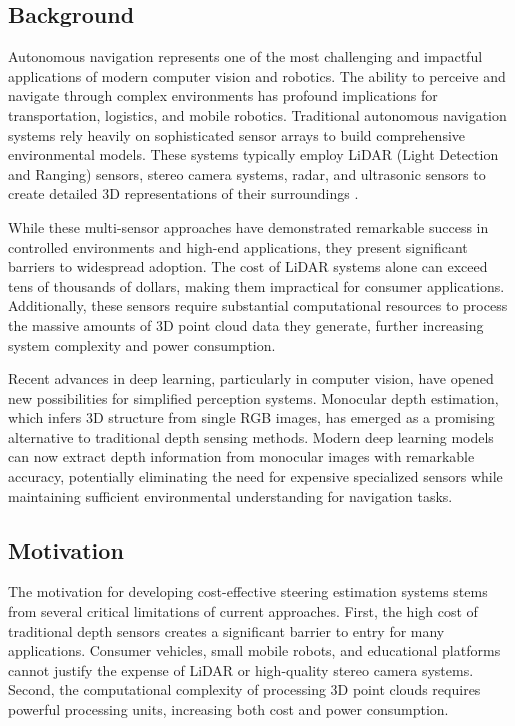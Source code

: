 \documentclass[conference]{IEEEtran}
\begin{document}
\subsection{Background}
Autonomous navigation represents one of the most challenging and impactful applications of modern computer vision and robotics. The ability to perceive and navigate through complex environments has profound implications for transportation, logistics, and mobile robotics. Traditional autonomous navigation systems rely heavily on sophisticated sensor arrays to build comprehensive environmental models. These systems typically employ LiDAR (Light Detection and Ranging) sensors, stereo camera systems, radar, and ultrasonic sensors to create detailed 3D representations of their surroundings \cite{b1}.

While these multi-sensor approaches have demonstrated remarkable success in controlled environments and high-end applications, they present significant barriers to widespread adoption. The cost of LiDAR systems alone can exceed tens of thousands of dollars, making them impractical for consumer applications. Additionally, these sensors require substantial computational resources to process the massive amounts of 3D point cloud data they generate, further increasing system complexity and power consumption.

Recent advances in deep learning, particularly in computer vision, have opened new possibilities for simplified perception systems. Monocular depth estimation, which infers 3D structure from single RGB images, has emerged as a promising alternative to traditional depth sensing methods. Modern deep learning models can now extract depth information from monocular images with remarkable accuracy, potentially eliminating the need for expensive specialized sensors while maintaining sufficient environmental understanding for navigation tasks.

\subsection{Motivation}
The motivation for developing cost-effective steering estimation systems stems from several critical limitations of current approaches. First, the high cost of traditional depth sensors creates a significant barrier to entry for many applications. Consumer vehicles, small mobile robots, and educational platforms cannot justify the expense of LiDAR or high-quality stereo camera systems. Second, the computational complexity of processing 3D point clouds requires powerful processing units, increasing both cost and power consumption.
\end{document}

